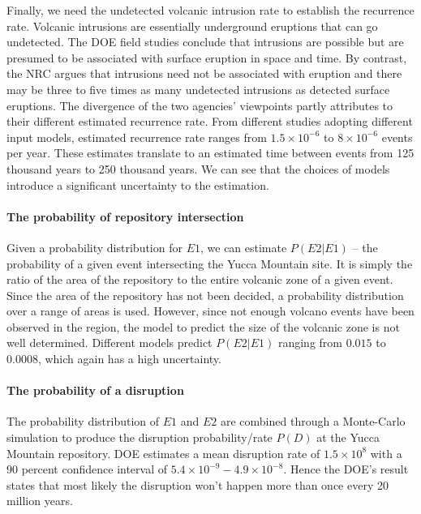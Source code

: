 \documentclass[nofootinbib,preprint,aps]{revtex4-1}
\begin{document}
        Finally, we need the undetected volcanic intrusion rate to establish the recurrence rate. Volcanic
        intrusions are essentially underground eruptions that can go undetected. The DOE field studies conclude
        that intrusions are possible but are presumed to be associated with surface eruption in space and time. 
        By contrast, the NRC argues that intrusions need not be associated with eruption and there
        may be three to five times as many undetected intrusions as detected surface eruptions. The divergence
        of the two agencies' viewpoints partly attributes to their different estimated recurrence rate.
        From different studies adopting different input models, estimated recurrence rate ranges from
        $1.5\times 10^{-6}$ to $8\times 10^{-6}$ events per year. These estimates translate to an estimated
        time between events from 125 thousand years to 250 thousand years. We can see that the choices of
        models introduce a significant uncertainty to the estimation.\cite{cv14}

        \paragraph{The probability of repository intersection}
        Given a probability distribution for $E1$, we can estimate $P(E2|E1)$ -- the probability of
        a given event intersecting the Yucca Mountain site. It is simply the ratio of the area of
        the repository to the entire volcanic zone of a given event. Since the area of the repository
        has not been decided, a probability distribution over a range of areas is used.
        However, since not enough volcano events have been observed in the region, the model
        to predict the size of the volcanic zone is not well determined.
        Different models predict $P(E2|E1)$ ranging from $0.015$ to $0.0008$, which again has a high
        uncertainty.

        \paragraph{The probability of a disruption} The probability distribution of $E1$ and $E2$
        are combined through a Monte-Carlo simulation to produce the disruption probability/rate $P(D)$
        at the Yucca Mountain repository. DOE estimates a mean disruption rate of $1.5\times 10^8$ with
        a 90 percent confidence interval of $5.4\times 10^{-9}-4.9\times 10^{-8}$. Hence the DOE's result
        states that most likely the disruption won't happen more than once every 20 million years.
\end{document}
